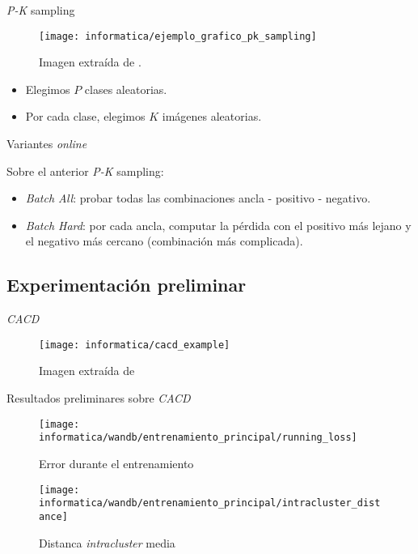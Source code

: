 \begin{frame}{\textit{P-K} sampling}

	\begin{figure}
		\texttt{[image: informatica/ejemplo\_grafico\_pk\_sampling]}
		\caption{Imagen extraída de \cite{informatica:paper_image_pk_sampling}.}
	\end{figure}

	\begin{itemize}
		\item Elegimos $P$ clases aleatorias.
		\item Por cada clase, elegimos $K$ imágenes aleatorias.
	\end{itemize}

\end{frame}

\begin{frame}{Variantes \textit{online}}

	Sobre el anterior \textit{P-K} sampling:

	\begin{itemize}
		\item \textit{Batch All}: probar todas las combinaciones ancla - positivo - negativo.
		\item \textit{Batch Hard}: por cada ancla, computar la pérdida con el positivo más lejano y el negativo más cercano (combinación más complicada).
	\end{itemize}

\end{frame}

\subsection{Experimentación preliminar}
\begin{frame}{\textit{CACD}}

	\begin{figure}
		\texttt{[image: informatica/cacd\_example]}
		\caption{Imagen extraída de \cite{informatica:paper_cacd}}
		\label{img:cacd_imagenes_ejemplo}
	\end{figure}

\end{frame}

\begin{frame}{Resultados preliminares sobre \textit{CACD}}
	\begin{figure}
		\texttt{[image: informatica/wandb/entrenamiento\_principal/running\_loss]}
		\caption{Error durante el entrenamiento}
	\end{figure}
\end{frame}
\begin{frame}
	\begin{figure}
		\texttt{[image: informatica/wandb/entrenamiento\_principal/intracluster\_distance]}
		\caption{Distanca \textit{intracluster} media}
	\end{figure}
\end{frame}

